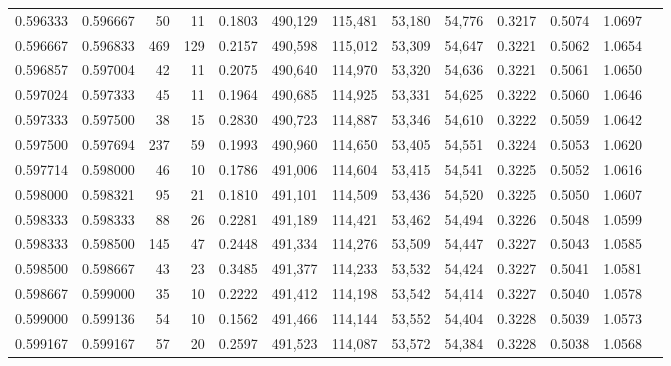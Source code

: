 \begin{tabular}{rrrrrrrrrrrrr}
0.596333 & 0.596667 &    50 &  11 &                                     0.1803 & 490,129 & 115,481 &  53,180 &  54,776 & 0.3217 & 0.5074 & 1.0697 \\
0.596667 & 0.596833 &   469 & 129 &                                     0.2157 & 490,598 & 115,012 &  53,309 &  54,647 & 0.3221 & 0.5062 & 1.0654 \\
0.596857 & 0.597004 &    42 &  11 &                                     0.2075 & 490,640 & 114,970 &  53,320 &  54,636 & 0.3221 & 0.5061 & 1.0650 \\
0.597024 & 0.597333 &    45 &  11 &                                     0.1964 & 490,685 & 114,925 &  53,331 &  54,625 & 0.3222 & 0.5060 & 1.0646 \\
0.597333 & 0.597500 &    38 &  15 &                                     0.2830 & 490,723 & 114,887 &  53,346 &  54,610 & 0.3222 & 0.5059 & 1.0642 \\
0.597500 & 0.597694 &   237 &  59 &                                     0.1993 & 490,960 & 114,650 &  53,405 &  54,551 & 0.3224 & 0.5053 & 1.0620 \\
0.597714 & 0.598000 &    46 &  10 &                                     0.1786 & 491,006 & 114,604 &  53,415 &  54,541 & 0.3225 & 0.5052 & 1.0616 \\
0.598000 & 0.598321 &    95 &  21 &                                     0.1810 & 491,101 & 114,509 &  53,436 &  54,520 & 0.3225 & 0.5050 & 1.0607 \\
0.598333 & 0.598333 &    88 &  26 &                                     0.2281 & 491,189 & 114,421 &  53,462 &  54,494 & 0.3226 & 0.5048 & 1.0599 \\
0.598333 & 0.598500 &   145 &  47 &                                     0.2448 & 491,334 & 114,276 &  53,509 &  54,447 & 0.3227 & 0.5043 & 1.0585 \\
0.598500 & 0.598667 &    43 &  23 &                                     0.3485 & 491,377 & 114,233 &  53,532 &  54,424 & 0.3227 & 0.5041 & 1.0581 \\
0.598667 & 0.599000 &    35 &  10 &                                     0.2222 & 491,412 & 114,198 &  53,542 &  54,414 & 0.3227 & 0.5040 & 1.0578 \\
0.599000 & 0.599136 &    54 &  10 &                                     0.1562 & 491,466 & 114,144 &  53,552 &  54,404 & 0.3228 & 0.5039 & 1.0573 \\
0.599167 & 0.599167 &    57 &  20 &                                     0.2597 & 491,523 & 114,087 &  53,572 &  54,384 & 0.3228 & 0.5038 & 1.0568 \\

\end{tabular}
